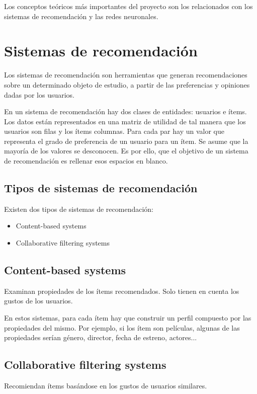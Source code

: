 
Los conceptos teóricos más importantes del proyecto son los relacionados con los sistemas de recomendación y las redes neuronales.

\section{Sistemas de recomendación}\label{sistemas-de-recomendacion}
Los sistemas de recomendación son herramientas que generan recomendaciones sobre un determinado objeto de estudio, a partir de las preferencias y opiniones dadas por los usuarios. \cite{sistemas-recomendacion}

En un sistema de recomendación hay dos clases de entidades: usuarios e ítems. Los datos están representados en una matriz de utilidad de tal manera que los usuarios son filas y los ítems columnas. Para cada par hay un valor que representa el grado de preferencia de un usuario para un ítem. Se asume que la mayoría de los valores se desconocen. Es por ello, que el objetivo de un sistema de recomendación es rellenar esos espacios en blanco.

\subsection{Tipos de sistemas de recomendación}\label{tipos-sistemas-recomendacion}
Existen dos tipos de sistemas de recomendación:
\begin{itemize}
\tightlist
\item Content-based systems
\item Collaborative filtering systems
\end{itemize}

\subsection{Content-based systems}\label{content-based-systems}
Examinan propiedades de los ítems recomendados. Solo tienen en cuenta los gustos de los usuarios.

En estos sistemas, para cada ítem hay que construir un perfil compuesto por las propiedades del mismo. Por ejemplo, si los ítem son películas, algunas de las propiedades serían género, director, fecha de estreno, actores...

\subsection{Collaborative filtering systems}\label{collaborative-filtering}
Recomiendan ítems basándose en los gustos de usuarios similares.

